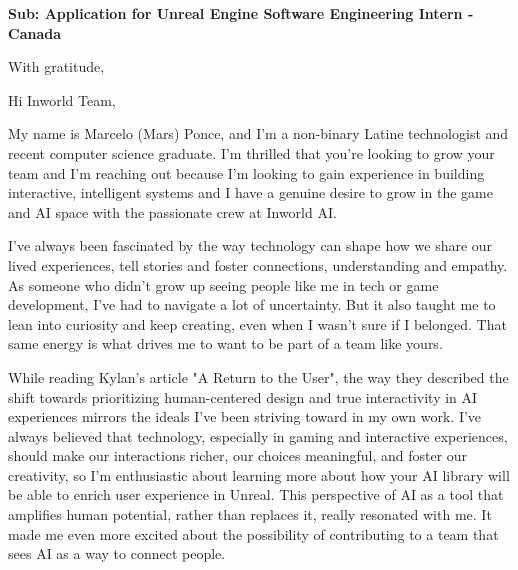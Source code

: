 \documentclass[11pt,a4paper,roman]{moderncv}
\begin{document}
\date{\today}
\opening{\textbf{Sub: Application for Unreal Engine Software Engineering Intern - Canada}}
\closing{With gratitude,}


\makelettertitle

Hi Inworld Team,

My name is Marcelo (Mars) Ponce, and I'm a non-binary Latine technologist and recent computer science graduate. I'm thrilled that you're looking to grow your team and I'm reaching out because I'm looking to gain experience in building interactive, intelligent systems and I have a genuine desire to grow in the game and AI space with the passionate crew at Inworld AI.

I’ve always been fascinated by the way technology can shape how we share our lived experiences, tell stories and foster connections, understanding and empathy. As someone who didn’t grow up seeing people like me in tech or game development, I’ve had to navigate a lot of uncertainty. But it also taught me to lean into curiosity and keep creating, even when I wasn’t sure if I belonged. That same energy is what drives me to want to be part of a team like yours.

While reading Kylan's article "A Return to the User", the way they described the shift towards prioritizing human-centered design and true interactivity in AI experiences mirrors the ideals I’ve been striving toward in my own work. I’ve always believed that technology, especially in gaming and interactive experiences, should make our interactions richer, our choices meaningful, and foster our creativity, so I'm enthusiastic about learning more about how your AI library will be able to enrich user experience in Unreal. This perspective of AI as a tool that amplifies human potential, rather than replaces it, really resonated with me. It made me even more excited about the possibility of contributing to a team that sees AI as a way to connect people.
\end{document}
